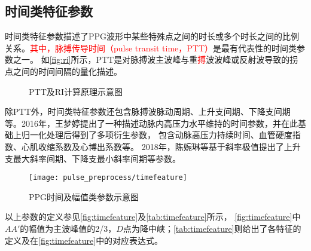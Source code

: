 \subsection{时间类特征参数}
时间类特征参数描述了PPG波形中某些特殊点之间的时长或多个时长之间的比例关系。\textcolor{red}{其中，脉搏传导时间（pulse transit time，PTT）}是最有代表性的时间类参数之一\cite{Brumfield2005,Su2014}。
如\autoref{fig:ri}所示，PTT是对脉搏波主波峰与重\textcolor{red}{搏}波波峰或反射波导致的拐点之间的时间间隔的量化描述。
\begin{figure}[htbp]
    \centering
    \quad
    \caption[PTT及RI计算原理示意图]{\label{fig:ri}PTT及RI计算原理示意图\cite{Su2014}}
\end{figure}

除PTT外，时间类特征参数还包含脉搏波脉动周期、上升支间期、下降支间期等。2016年，王梦婷\cite{mmt}提出了一种描述动脉内高压力水平维持的时间参数，并在此基础上归一化处理后得到了多项衍生参数，
包含动脉高压力持续时间、血管硬度指数、心肌收缩系数及心博出系数等。
2018年，陈婉琳等\cite{cwl}基于斜率极值提出了上升支最大斜率间期、下降支最小斜率间期等参数。
\begin{figure}[htbp]
    \centering
    \texttt{[image: pulse\_preprocess/timefeature]}
    \caption[常见的PPG时间及幅值类参数示意图]{\label{fig:timefeature}PPG时间及幅值类参数示意图}
\end{figure}

以上参数的定义参见\autoref{fig:timefeature}及\autoref{tab:timefeature}所示，
\autoref{fig:timefeature}中$AA'$的幅值为主波峰值的2/3，$D$点为降中峡\cite{mmt}；\autoref{tab:timefeature}则给出了各特征的定义及在\autoref{fig:timefeature}中的对应表达式。

